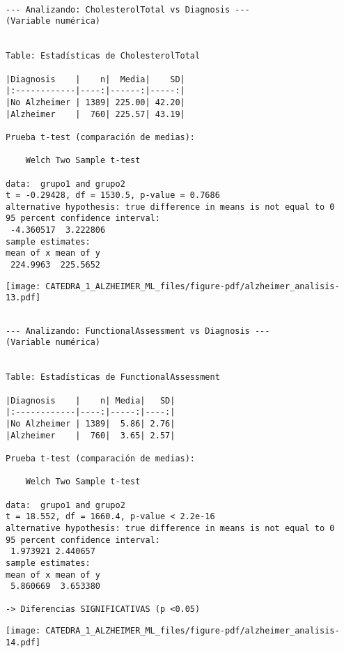 \documentclass[
  letterpaper,
  DIV=11,
  numbers=noendperiod]{scrartcl}
\begin{document}
\begin{verbatim}

--- Analizando: CholesterolTotal vs Diagnosis ---
(Variable numérica)


Table: Estadísticas de CholesterolTotal

|Diagnosis    |    n|  Media|    SD|
|:------------|----:|------:|-----:|
|No Alzheimer | 1389| 225.00| 42.20|
|Alzheimer    |  760| 225.57| 43.19|

Prueba t-test (comparación de medias):

    Welch Two Sample t-test

data:  grupo1 and grupo2
t = -0.29428, df = 1530.5, p-value = 0.7686
alternative hypothesis: true difference in means is not equal to 0
95 percent confidence interval:
 -4.360517  3.222806
sample estimates:
mean of x mean of y 
 224.9963  225.5652 
\end{verbatim}

\begin{center}
\texttt{[image: CATEDRA\_1\_ALZHEIMER\_ML\_files/figure-pdf/alzheimer\_analisis-13.pdf]}
\end{center}

\begin{verbatim}

--- Analizando: FunctionalAssessment vs Diagnosis ---
(Variable numérica)


Table: Estadísticas de FunctionalAssessment

|Diagnosis    |    n| Media|   SD|
|:------------|----:|-----:|----:|
|No Alzheimer | 1389|  5.86| 2.76|
|Alzheimer    |  760|  3.65| 2.57|

Prueba t-test (comparación de medias):

    Welch Two Sample t-test

data:  grupo1 and grupo2
t = 18.552, df = 1660.4, p-value < 2.2e-16
alternative hypothesis: true difference in means is not equal to 0
95 percent confidence interval:
 1.973921 2.440657
sample estimates:
mean of x mean of y 
 5.860669  3.653380 

-> Diferencias SIGNIFICATIVAS (p <0.05)
\end{verbatim}

\begin{center}
\texttt{[image: CATEDRA\_1\_ALZHEIMER\_ML\_files/figure-pdf/alzheimer\_analisis-14.pdf]}
\end{center}
\end{document}
